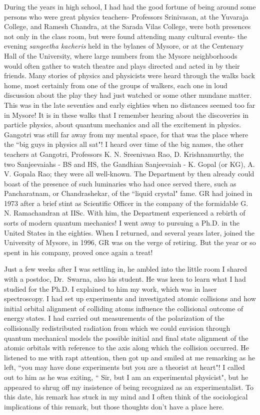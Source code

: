 During the years in high school, I had had the good fortune of being around some persons who were great physics teachers- Professors Srinivasan, at the Yuvaraja College, and Ramesh Chandra, at the Sarada Vilas College, were both presences not only in the class room, but were found attending many cultural events- the evening \textit{sangeetha kacheris} held in the bylanes of Mysore, or at the Centenary Hall of the University, where large numbers from the Mysore neighborhoods would often gather to watch theatre and plays directed and acted in by their friends. Many stories of physics and physicists were heard through the walks back home, most certainly from one of the groups of walkers, each one in loud discussion about the play they had just watched or some other mundane matter. This was in the late seventies and early eighties when no distances seemed too far in Mysore!  It is in these walks that I remember hearing about the discoveries in particle physics, about quantum mechanics and all the excitement in physics. Gangotri was still far away from my mental space, for that was the place where the ``big guys in physics all sat"! I heard over time of the big names, the other teachers at Gangotri, Professors K. N. Sreenivasa Rao, D. Krishnamurthy, the two Sanjeevaiahs - BS and HS, the Gandhian Sanjeevaiah - K. Gopal (or KG), A. V. Gopala Rao;  they were all well-known. The Department by then already could boast of the presence of such luminaries who had once served there, such as Pancharatnam, or Chandrashekar, of the ``liquid crystal" fame. GR had joined in 1973 after a brief stint as Scientific Officer in the company of the formidable G. N. Ramachandran at IISc. With him, the Department experienced a rebirth of sorts of modern quantum mechanics!  I went away to pursuing a Ph.D. in the United States in the eighties. When I returned, and several years later, joined the University of Mysore, in 1996, GR was on the verge of retiring. But the year or so spent in his company, proved once again a treat!

Just a few weeks after I was settling in, he ambled into the little room I shared with a postdoc, Dr.\ Swarna, also his student. He was keen to learn what I had studied for the Ph.D. I explained to him my work, which was in laser spectroscopy. I had set up experiments and investigated atomic collisions and how initial orbital alignment of colliding atoms influence the collisional outcome of energy states. I had carried out measurements of the polarization of the collisionally redistributed radiation from which we could envision through quantum mechanical models the possible initial and final state alignment of the atomic orbitals with reference to the axis along which the collision occurred. He listened to me with rapt attention, then got up and smiled at me remarking as he left, ``you may have done experiments but you are a theorist at heart"!  I called out to him as he was exiting, `` Sir, but I am an experimental physicist", but he appeared to shrug off my insistence of being recognized as an experimentalist. To this date, his remark has stuck in my mind and I often think of the sociological implications of this remark, but those thoughts don't have a place here.


